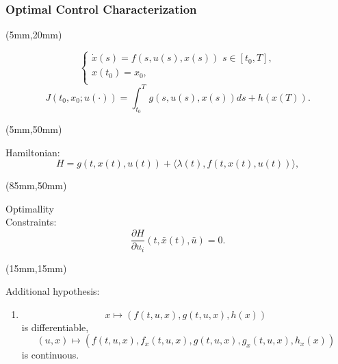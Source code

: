 \begin{frame}[plain]
\frametitle{Optimal Control Characterization}
\begin{textblock*}{120mm}(5mm,20mm)
	\begin{yellowbox}{}
		$$\left\{ \begin{array}{l}
		\dot{x}(s)=f(s,u(s),x(s))\,\,s\in [t_0,T], \\
		x(t_0)=x_0,\\
		\end{array}
		\right.$$			
		$$J(t_0,x_0;u(\cdot))=\int_{t_0}^{T}g(s,u(s),x(s))ds+h(x(T)).$$
	\end{yellowbox}
\end{textblock*}

	\begin{textblock*}{75mm}(5mm,50mm)
		\begin{greenbox}{Hamiltonian:}
			\begin{equation*}
			H=g(t,x(t),u(t))+\langle \lambda(t),f(t,x(t),u(t))\rangle,
			\end{equation*}
		\end{greenbox}
	\end{textblock*}

	\begin{textblock*}{40mm}(85mm,50mm)
		\begin{yellowbox}{Optimallity\\ Constraints:}
			\begin{equation*}
			\frac{\partial H}{\partial u_i}(t,\bar{x}(t),\bar{u})=0.
			\end{equation*}
		\end{yellowbox}
	\end{textblock*}
	
\end{frame}
\begin{frame}[plain]
	\begin{textblock*}{100mm}(15mm,15mm)
		\begin{graybox}{Additional hypothesis:}
			\begin{enumerate}[(\textbf{{C}}-4)]
				\item
				$$
					x \mapsto (f(t,u,x),g(t,u,x),h(x))
				$$
				is differentiable,
				$$
				(u,x) \mapsto (f(t,u,x),f_x(t,u,x),g(t,u,x),g_x(t,u,x),h_x(x))
				$$
				is continuous.				
			\end{enumerate}	
		\end{graybox}
	\end{textblock*}
\end{frame}
